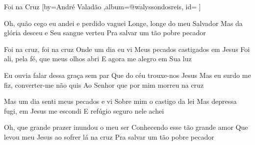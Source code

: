 \beginsong
{Foi na Cruz %
}[by={André Valadão %
},album={@walyssondosreis},
id={ %
}] 

\beginverse*
Oh, quão cego eu andei e perdido vaguei
Longe, longe do meu Salvador
Mas da glória desceu e Seu sangue verteu
Pra salvar um tão pobre pecador
\endverse

\beginchorus
Foi na cruz, foi na cruz
Onde um dia eu vi
Meus pecados castigados em Jesus
Foi ali, pela fé, que meus olhos abri
E agora me alegro em Sua luz
\endchorus

\beginverse*
Eu ouvia falar dessa graça sem par
Que do céu trouxe-nos Jesus
Mas eu surdo me fiz, converter-me não quis
Ao Senhor que por mim morreu na cruz
\endverse

\beginverse*
Mas um dia senti meus pecados e vi
Sobre mim o castigo da lei
Mas depressa fugi, em Jesus me escondi
E refúgio seguro nele achei
\endverse

\beginverse*
Oh, que grande prazer inundou o meu ser
Conhecendo esse tão grande amor
Que levou meu Jesus ao sofrer lá na cruz
Pra salvar um tão pobre pecador
\endverse
\begin{comment}
\lstset{basicstyle=\scriptsize\bf} %
\tab{Solo 1}
\begin{lstlisting}
E|-----------------------------------------------------|
B|-----------------------------------------------------|
G|-----------------------------------------------------|
D|-----------------------------------------------------|
A|-----------------------------------------------------|
E|-----------------------------------------------------|
\end{lstlisting}
\end{comment}
\vspace{2em}
%
%
% 
% 
\endsong
\begin{comment}

\end{comment}